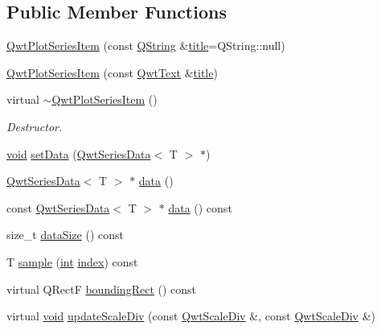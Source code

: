 \subsection*{Public Member Functions}
\begin{DoxyCompactItemize}
\item 
\hyperlink{class_qwt_plot_series_item_a0bb060e109f2a957ef9750a37908afc7}{Qwt\-Plot\-Series\-Item} (const \hyperlink{group___u_a_v_objects_plugin_gab9d252f49c333c94a72f97ce3105a32d}{Q\-String} \&\hyperlink{class_qwt_plot_item_a3859d011b670b5f89e45d1ccef9206f7}{title}=Q\-String\-::null)
\item 
\hyperlink{class_qwt_plot_series_item_a4897128406328d3f4e391c739355082d}{Qwt\-Plot\-Series\-Item} (const \hyperlink{class_qwt_text}{Qwt\-Text} \&\hyperlink{class_qwt_plot_item_a3859d011b670b5f89e45d1ccef9206f7}{title})
\item 
virtual \hyperlink{class_qwt_plot_series_item_a99e5f0fa58e3de5dfee39220b2e7e382}{$\sim$\-Qwt\-Plot\-Series\-Item} ()
\begin{DoxyCompactList}\small\item\em Destructor. \end{DoxyCompactList}\item 
\hyperlink{group___u_a_v_objects_plugin_ga444cf2ff3f0ecbe028adce838d373f5c}{void} \hyperlink{class_qwt_plot_series_item_adba072515f7c71c923985882129878c4}{set\-Data} (\hyperlink{class_qwt_series_data}{Qwt\-Series\-Data}$<$ T $>$ $\ast$)
\item 
\hyperlink{class_qwt_series_data}{Qwt\-Series\-Data}$<$ T $>$ $\ast$ \hyperlink{class_qwt_plot_series_item_a3bf9920dace582cba17f18b522ed49dc}{data} ()
\item 
const \hyperlink{class_qwt_series_data}{Qwt\-Series\-Data}$<$ T $>$ $\ast$ \hyperlink{class_qwt_plot_series_item_a02b7f6c94e92f2248bb6daaca48d177b}{data} () const 
\item 
size\-\_\-t \hyperlink{class_qwt_plot_series_item_acbe4a4253fbabf943fbbf3813ffff743}{data\-Size} () const 
\item 
T \hyperlink{class_qwt_plot_series_item_a65865ed7b7c124c6ec538c2d8f1e8292}{sample} (\hyperlink{ioapi_8h_a787fa3cf048117ba7123753c1e74fcd6}{int} \hyperlink{glext_8h_ab47dd9958bcadea08866b42bf358e95e}{index}) const 
\item 
virtual Q\-Rect\-F \hyperlink{class_qwt_plot_series_item_a183e7c88364eeea8e7c53b56604e0763}{bounding\-Rect} () const 
\item 
virtual \hyperlink{group___u_a_v_objects_plugin_ga444cf2ff3f0ecbe028adce838d373f5c}{void} \hyperlink{class_qwt_plot_series_item_a5c40b692a48718b71bed27a1802c50d0}{update\-Scale\-Div} (const \hyperlink{class_qwt_scale_div}{Qwt\-Scale\-Div} \&, const \hyperlink{class_qwt_scale_div}{Qwt\-Scale\-Div} \&)
\end{DoxyCompactItemize}
